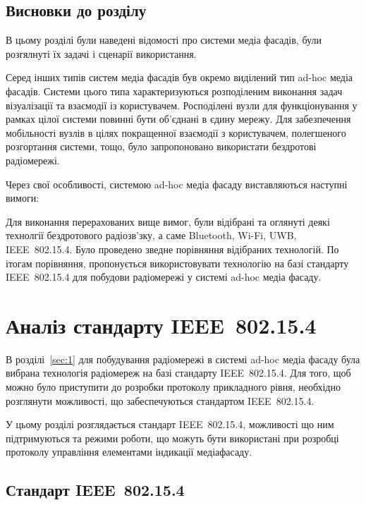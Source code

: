 \documentclass[a4paper,ukrainian,utf8,nocolumnsxix,floatsection]{eskdtext}
\let\stdsection\section
\renewcommand\section{\clearpage\stdsection}
\newcommand{\iee}[0]{IEEE~802.15.4\xspace}
\begin{document}
\subsection{Висновки до розділу}

В цьому розділі були наведені відомості про системи медіа фасадів, були розгялнуті їх задачі і сценарії використання. 

Серед інших типів систем медіа фасадів був окремо виділений тип ad-hoc медіа фасадів. Системи цього типа характеризуються розподіленим виконання задач візуалізації та взаємодії із користувачем. Росподілені вузли для функціонування у рамках цілої системи повинні бути об’єднані в єдину мережу. Для забезпечення мобільності вузлів в цілях покращенної взаємодії з користувачем, полегшеного розгортання системи, тощо, було запропоновано використати бездротові радіомережі.

Через свої особливості, системою ad-hoc медіа фасаду виставляються наступні вимоги: \todo{}

Для виконання перерахованих вище вимог, були відібрані та оглянуті деякі технолгії бездротового радіозв’зку, а саме Bluetooth, Wi-Fi, UWB, \iee. Було проведено зведне порівняння відібраних технологій. По ітогам порівняння, пропонується використовувати технологію на базі стандарту \iee для побудови радіомережі у системі ad-hoc медіа фасаду. 



\section{Аналіз стандарту \iee}

В розділі~\ref{sec:1} для побудування радіомережі в системі ad-hoc медіа фасаду була вибрана технологія радіомереж на базі стандарту \iee. Для того, щоб можно було приступити до розробки протоколу прикладного рівня, необхідно розглянути можливості, що забеспечуються стандартом \iee.

У цьому розділі розглядається стандарт \iee, можливості що ним підтримуються та режими роботи, що можуть бути використані при розробці протоколу управління елементами індикації медіафасаду. 


\subsection{Стандарт \iee}
\label{sub:ieee:standard}
\end{document}
